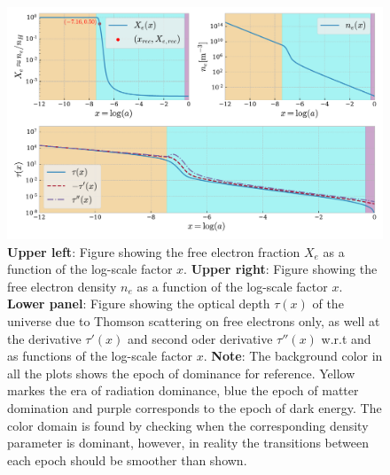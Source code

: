 \documentclass[twocolumn]{aastex62}
\begin{document}
\begin{figure}
    \includegraphics[scale = 0.65]{Figures/Xe_ne_tau.pdf}
    \caption{\textbf{Upper left}: Figure showing the free electron fraction $X_e$ 
    as a function of the log-scale factor $x$. \textbf{Upper right}: Figure showing the free electron density $n_e$
    as a function of the log-scale factor $x$. \textbf{Lower panel}: Figure showing the optical depth $\tau(x)$ of the universe due to 
    Thomson scattering on free electrons only, as well at the derivative $\tau'(x)$ and second oder derivative $\tau''(x)$ w.r.t 
    and as functions of the log-scale factor $x$. \textbf{Note}: The background color in all the plots shows the epoch of dominance
    for reference. Yellow markes the era of radiation dominance, blue the epoch of matter domination
    and purple corresponds to the epoch of dark energy. The color domain is found by checking 
    when the corresponding density parameter is dominant,
    however, in reality the transitions between each epoch should be smoother than shown.}
    \label{fig:Xe}
\end{figure}
\end{document}

